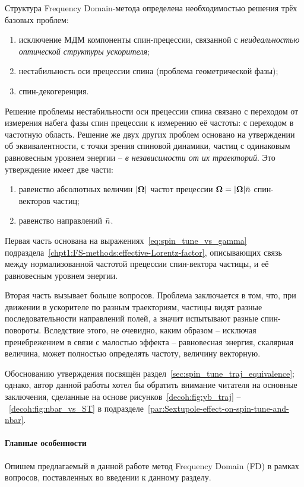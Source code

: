 Структура Frequency Domain-метода определена необходимостью решения трёх базовых проблем:
\begin{enumerate}[(1)]
	\item исключение МДМ компоненты спин-прецессии, связанной с
		\emph{неидеальностью оптической структуры ускорителя};
	\item нестабильность оси прецессии спина (проблема геометрической фазы);
	\item спин-декогеренция.
\end{enumerate}

Решение проблемы нестабильности оси прецессии спина связано с переходом от измерения набега фазы
спин прецессии к измерению её частоты: с переходом в частотную область. Решение же двух других 
проблем основано на утверждении об эквивалентности, с точки зрения спиновой динамики, частиц 
с одинаковым равновесным уровнем энергии -- \emph{в независимости от их траекторий}. 
Это утверждение имеет две части:
\begin{enumerate}[(1)]
	\item равенство абсолютных величин $|\boldsymbol{\Omega}|$ частот прецессии $\boldsymbol{\Omega} = |\boldsymbol{\Omega}|\bar n$
		 спин-векторов частиц;
	\item равенство направлений $\bar n$.
\end{enumerate}

Первая часть основана на выражениях~\eqref{eq:spin_tune_vs_gamma}
подраздела~\ref{chpt1:FS-methods:effective-Lorentz-factor}, описывающих связь между
нормализованной частотой прецессии спин-вектора частицы, и её равновесным уровнем энергии.

Вторая часть вызывает больше вопросов. Проблема заключается в том, что, при движении в
ускорителе по разным траекториям, частицы видят разные последовательности направлений полей,
а значит испытывают разные спин-повороты. Вследствие этого, не очевидно, каким образом -- исключая
пренебрежением в связи с малостью эффекта -- равновесная энергия, скалярная величина, может полностью
определять частоту, величину векторную. 

Обоснованию утверждения посвящён раздел~\ref{sec:spin_tune_traj_equivalence}; однако, автор данной работы 
хотел бы обратить внимание читателя на основные заключения, сделанные на основе
рисунков~\ref{decoh:fig:yb_traj} --~\ref{decoh:fig:nbar_vs_ST} в подразделе~\ref{par:Sextupole-effect-on-spin-tune-and-nbar}.

\paragraph{Главные особенности}
Опишем предлагаемый в данной работе метод Frequency Domain (FD) в рамках вопросов, поставленных во введении
к данному разделу.

